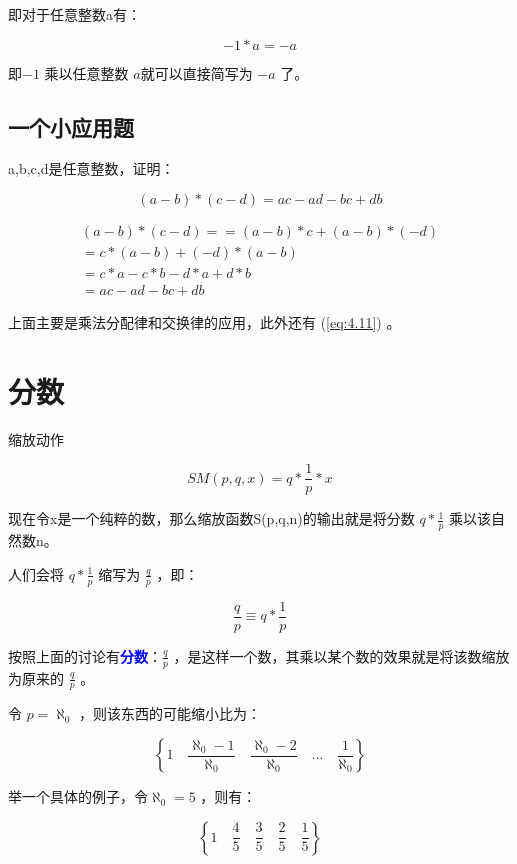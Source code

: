 \documentclass[12pt,oneside]{book}
\renewcommand{\emph}[1]{\textcolor{blue}{\textbf{#1}}}
\begin{document}
即对于任意整数a有：

\begin{equation}
\label{eq:4.11}
-1 * a = -a
\end{equation}

即$-1$ 乘以任意整数 $a$就可以直接简写为 $-a$ 了。

\subsection{一个小应用题}
a,b,c,d是任意整数，证明：

\begin{equation}
(a-b) * (c-d) = ac - ad - bc +db 
\end{equation}

\begin{align*}
(a-b) * (c-d) = = (a-b) * c + (a-b) *(-d)\\
= c*(a-b) + (-d) * (a-b) \\
= c*a  - c*b -d*a + d*b\\
= ac -ad -bc +db
\end{align*}

上面主要是乘法分配律和交换律的应用，此外还有 (\ref{eq:4.11}) 。


\section{分数}
缩放动作

\begin{equation}
SM(p,q,x) = q* \frac{1}{p} *x
\end{equation}

现在令x是一个纯粹的数，那么缩放函数S(p,q,n)的输出就是将分数 $q* \frac{1}{p}$ 乘以该自然数n。

人们会将 $q* \frac{1}{p}$ 缩写为 $\frac{q}{p}$ ，即：

\begin{equation}
\frac{q}{p} \equiv q* \frac{1}{p}
\end{equation}

按照上面的讨论有\emph{分数}：$\frac{q}{p}$ ，是这样一个数，其乘以某个数的效果就是将该数缩放为原来的 $\frac{q}{p}$ 。


令 $p=\aleph_0$ ，则该东西的可能缩小比为：

\[
\left\{1 \quad \frac{\aleph_0-1}{\aleph_0} \quad \frac{\aleph_0-2}{\aleph_0} \quad  ...  \quad \frac{1}{\aleph_0} \right\}
\]

举一个具体的例子，令$\aleph_0 = 5$ ，则有：

\[
\left\{1 \quad \frac{4}{5} \quad \frac{3}{5} \quad  \frac{2}{5}  \quad \frac{1}{5} \right\}
\]
\end{document}
